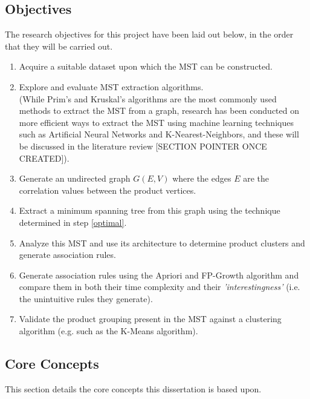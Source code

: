 \documentclass[a4paper,11pt]{article}
\begin{document}
\subsection{Objectives}
The research objectives for this project have been laid out below, in the order that they will be carried out.
\begin{enumerate}
\item Acquire a suitable dataset upon which the MST can be constructed.

\item \label{optimal} Explore and evaluate MST extraction algorithms.
\\(While Prim's \cite{prims}\cite{prims_og} and Kruskal's \cite{kruskal} algorithms are the most commonly used methods to extract the MST from a graph, research has been conducted on more efficient ways to extract the MST using machine learning techniques such as Artificial Neural Networks and K-Nearest-Neighbors, and these will be discussed in the literature review [SECTION POINTER ONCE CREATED]).

\item Generate an undirected graph $G(E,V)$ where the edges $E$ are the correlation values between the product vertices.

\item Extract a minimum spanning tree from this graph using the technique determined in step \ref{optimal}. 

\item Analyze this MST and use its architecture to determine product clusters and generate association rules.

\item Generate association rules using the Apriori and FP-Growth algorithm and compare them in both their time complexity and their \textit{'interestingness'} (i.e. the unintuitive rules they generate).

\item Validate the product grouping present in the MST against a clustering algorithm (e.g.  such as the K-Means algorithm).

\end{enumerate}

\subsection{Core Concepts} %
This section details the core concepts this dissertation is based upon.
\end{document}
